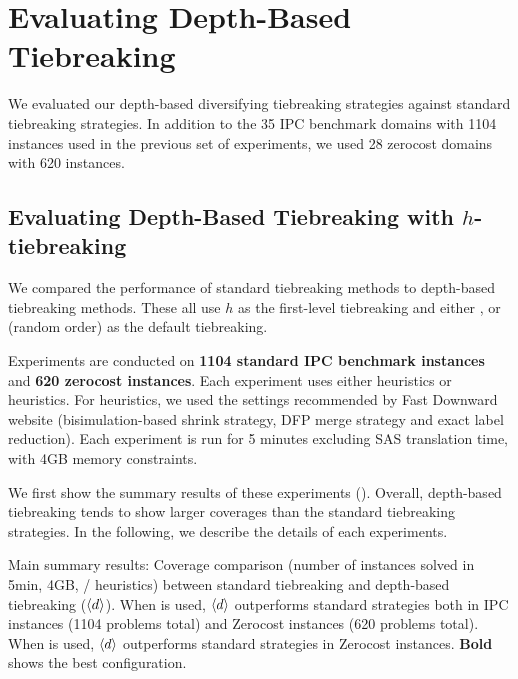 \section{Evaluating Depth-Based Tiebreaking}
\label{sec:depth-based-evaluation}
We evaluated our depth-based diversifying tiebreaking strategies against standard
tiebreaking strategies.
In addition to the 35 IPC benchmark domains with 1104 instances used in
the previous set of experiments, we used 28 zerocost domains with 620
instances.

\subsection{Evaluating Depth-Based Tiebreaking with $h$-tiebreaking}

We compared the performance of standard tiebreaking methods to
depth-based tiebreaking methods. These all use $h$ as the first-level
tiebreaking and either \fifo, \lifo or \ro (random order) as the
default tiebreaking.

Experiments are conducted on \textbf{1104 standard IPC benchmark
instances} and \textbf{620 zerocost instances}.  Each experiment uses
either \lmcut heuristics or \mands heuristics.  For \mands heuristics,
we used the settings recommended by Fast Downward website
(bisimulation-based shrink strategy, DFP merge strategy and exact label
reduction). Each experiment is run for 5 minutes excluding SAS
translation time, with 4GB memory constraints.

We first show the summary results of these experiments ().
Overall, depth-based tiebreaking tends to show larger coverages than the
standard tiebreaking strategies. 
In the following, we describe the
details of each experiments.

\begin{table}[htb]
 {
 \centering
 \setlength{\tabcolsep}{3pt}
 
 \caption{
 Main summary results: Coverage comparison (number of instances solved in 5min, 4GB, \lmcut/\mands
 heuristics) between standard tiebreaking and depth-based tiebreaking
 (${\left<d\right>}$). When \lmcut is used, ${\left<d\right>}$ outperforms standard strategies both in IPC
 instances (1104 problems total) and Zerocost instances (620 problems
 total). When \mands is used, ${\left<d\right>}$ outperforms standard strategies
 in Zerocost instances. \textbf{Bold} shows the best configuration.}
 \label{tbl:depth-summary}
 }
\end{table}

